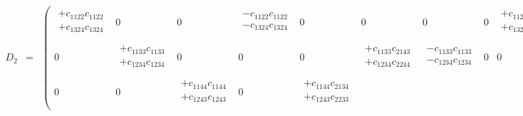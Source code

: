 \begin{eqnarray}
D_2 &=&
\begin{pmatrix}
\begin{array}{l}
+c_{1122}c_{1122} \\
+c_{1324}c_{1324} \\
\end{array} &
0 &
0 &
\begin{array}{l}
-c_{1122}c_{1122} \\
-c_{1324}c_{1324} \\
\end{array} &
0 &
0 &
0 &
0 &
\begin{array}{l}
+c_{1122}c_{3142} \\
+c_{1324}c_{3344} \\
\end{array} &
0 &
0 &
\begin{array}{l}
-c_{1122}c_{3142} \\
-c_{1324}c_{3344} \\
\end{array} \\
0 &
\begin{array}{l}
+c_{1133}c_{1133} \\
+c_{1234}c_{1234} \\
\end{array} &
0 &
0 &
0 &
\begin{array}{l}
+c_{1133}c_{2143} \\
+c_{1234}c_{2244} \\
\end{array} &
\begin{array}{l}
-c_{1133}c_{1133} \\
-c_{1234}c_{1234} \\
\end{array} &
0 &
0 &
0 &
\begin{array}{l}
-c_{1133}c_{2143} \\
-c_{1234}c_{2244} \\
\end{array} &
0 \\
0 &
0 &
\begin{array}{l}
+c_{1144}c_{1144} \\
+c_{1243}c_{1243} \\
\end{array} &
0 &
\begin{array}{l}
+c_{1144}c_{2134} \\
+c_{1243}c_{2233} \\
\end{array} &

\end{pmatrix}
\end{eqnarray}
